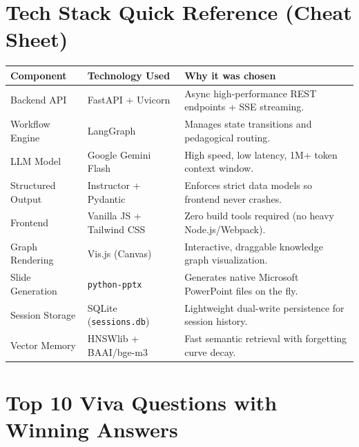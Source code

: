 \documentclass[11pt,a4paper]{article}
\begin{document}
\section{Tech Stack Quick Reference (Cheat Sheet)}

\begin{table}[htbp]
\centering
\small
\begin{tabular}{lll}
\toprule
\textbf{Component} & \textbf{Technology Used} & \textbf{Why it was chosen} \\
\midrule
Backend API & FastAPI + Uvicorn & Async high-performance REST endpoints + SSE streaming. \\
Workflow Engine & LangGraph & Manages state transitions and pedagogical routing. \\
LLM Model & Google Gemini Flash & High speed, low latency, 1M+ token context window. \\
Structured Output & Instructor + Pydantic & Enforces strict data models so frontend never crashes. \\
Frontend & Vanilla JS + Tailwind CSS & Zero build tools required (no heavy Node.js/Webpack). \\
Graph Rendering & Vis.js (Canvas) & Interactive, draggable knowledge graph visualization. \\
Slide Generation & \texttt{python-pptx} & Generates native Microsoft PowerPoint files on the fly. \\
Session Storage & SQLite (\texttt{sessions.db}) & Lightweight dual-write persistence for session history. \\
Vector Memory & HNSWlib + BAAI/bge-m3 & Fast semantic retrieval with forgetting curve decay. \\
\bottomrule
\end{tabular}
\end{table}

\section{Top 10 Viva Questions with Winning Answers}
\end{document}
